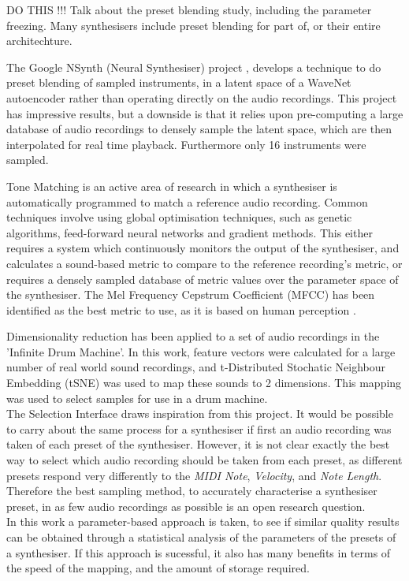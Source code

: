 \documentclass[11pt, oneside]{report}   	%
\begin{document}
DO THIS !!! Talk about the preset blending study, including the parameter freezing.
Many synthesisers include preset blending for part of, or their entire architechture. 

The Google NSynth (Neural Synthesiser) project \cite{NSynth}, develops a technique to do preset blending of sampled instruments, in a latent space of a WaveNet autoencoder rather than operating directly on the audio recordings. This project has impressive results, but a downside is that it relies upon pre-computing a large database of audio recordings to densely sample the latent space, which are then interpolated for real time playback. Furthermore only 16 instruments were sampled.

Tone Matching is an active area of research in which a synthesiser is automatically programmed to match a reference audio recording. Common techniques involve using global optimisation techniques, such as genetic algorithms, feed-forward neural networks and gradient methods. This either requires a system which continuously monitors the output of the synthesiser, and calculates a sound-based metric to compare to the reference recording's metric, or requires a densely sampled database of metric values over the parameter space of the synthesiser.  The Mel Frequency Cepstrum Coefficient (MFCC) has been identified as the best metric to use, as it is based on human perception \cite{YeeKing}.

Dimensionality reduction has been applied to a set of audio recordings in the 'Infinite Drum Machine'. In this work, feature vectors were calculated for a large number of real world sound recordings, and t-Distributed Stochatic Neighbour Embedding (tSNE) was used to map these sounds to 2 dimensions. This mapping was used to select samples for use in a drum machine. \\
The Selection Interface draws inspiration from this project. It would be possible to carry about the same process for a synthesiser if first an audio recording was taken of each preset of the synthesiser. However, it is not clear exactly the best way to select which audio recording should be taken from each preset, as different presets respond very differently to the \emph{MIDI Note}, \emph{Velocity}, and \emph{Note Length}. Therefore the best sampling method, to accurately characterise a synthesiser preset, in as few audio recordings as possible is an open research question.\\
In this work a parameter-based approach is taken, to see if similar quality results can be obtained through a statistical analysis of the parameters of the presets of a synthesiser. If this approach is sucessful, it also has many benefits in terms of the speed of the mapping, and the amount of storage required.
\end{document}
